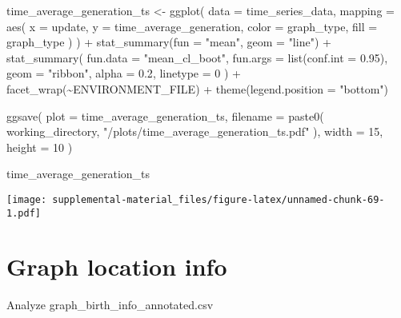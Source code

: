 \documentclass[
]{book}
\newenvironment{Shaded}{\begin{snugshade}}{\end{snugshade}}
\newcommand{\AttributeTok}[1]{\textcolor[rgb]{0.77,0.63,0.00}{#1}}
\newcommand{\DecValTok}[1]{\textcolor[rgb]{0.00,0.00,0.81}{#1}}
\newcommand{\FloatTok}[1]{\textcolor[rgb]{0.00,0.00,0.81}{#1}}
\newcommand{\FunctionTok}[1]{\textcolor[rgb]{0.00,0.00,0.00}{#1}}
\newcommand{\NormalTok}[1]{#1}
\newcommand{\OtherTok}[1]{\textcolor[rgb]{0.56,0.35,0.01}{#1}}
\newcommand{\SpecialCharTok}[1]{\textcolor[rgb]{0.00,0.00,0.00}{#1}}
\newcommand{\StringTok}[1]{\textcolor[rgb]{0.31,0.60,0.02}{#1}}
\begin{document}
\begin{Shaded}
\begin{Highlighting}[]
\NormalTok{time\_average\_generation\_ts }\OtherTok{\textless{}{-}} \FunctionTok{ggplot}\NormalTok{(}
    \AttributeTok{data =}\NormalTok{ time\_series\_data,}
    \AttributeTok{mapping =} \FunctionTok{aes}\NormalTok{(}
      \AttributeTok{x =}\NormalTok{ update,}
      \AttributeTok{y =}\NormalTok{ time\_average\_generation,}
      \AttributeTok{color =}\NormalTok{ graph\_type,}
      \AttributeTok{fill =}\NormalTok{ graph\_type}
\NormalTok{    )}
\NormalTok{  ) }\SpecialCharTok{+}
  \FunctionTok{stat\_summary}\NormalTok{(}\AttributeTok{fun =} \StringTok{"mean"}\NormalTok{, }\AttributeTok{geom =} \StringTok{"line"}\NormalTok{) }\SpecialCharTok{+}
  \FunctionTok{stat\_summary}\NormalTok{(}
    \AttributeTok{fun.data =} \StringTok{"mean\_cl\_boot"}\NormalTok{,}
    \AttributeTok{fun.args =} \FunctionTok{list}\NormalTok{(}\AttributeTok{conf.int =} \FloatTok{0.95}\NormalTok{),}
    \AttributeTok{geom =} \StringTok{"ribbon"}\NormalTok{,}
    \AttributeTok{alpha =} \FloatTok{0.2}\NormalTok{,}
    \AttributeTok{linetype =} \DecValTok{0}
\NormalTok{  ) }\SpecialCharTok{+}
  \FunctionTok{facet\_wrap}\NormalTok{(}\SpecialCharTok{\textasciitilde{}}\NormalTok{ENVIRONMENT\_FILE) }\SpecialCharTok{+}
  \FunctionTok{theme}\NormalTok{(}\AttributeTok{legend.position =} \StringTok{"bottom"}\NormalTok{)}

\FunctionTok{ggsave}\NormalTok{(}
  \AttributeTok{plot =}\NormalTok{ time\_average\_generation\_ts,}
  \AttributeTok{filename =} \FunctionTok{paste0}\NormalTok{(}
\NormalTok{    working\_directory,}
    \StringTok{"/plots/time\_average\_generation\_ts.pdf"}
\NormalTok{  ),}
  \AttributeTok{width =} \DecValTok{15}\NormalTok{,}
  \AttributeTok{height =} \DecValTok{10}
\NormalTok{)}

\NormalTok{time\_average\_generation\_ts}
\end{Highlighting}
\end{Shaded}

\texttt{[image: supplemental-material\_files/figure-latex/unnamed-chunk-69-1.pdf]}

\hypertarget{graph-location-info}{%
\section{Graph location info}\label{graph-location-info}}

Analyze graph\_birth\_info\_annotated.csv
\end{document}
